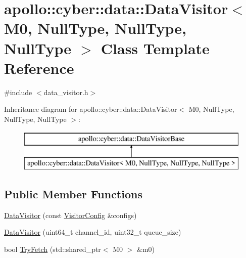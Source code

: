 \hypertarget{classapollo_1_1cyber_1_1data_1_1DataVisitor_3_01M0_00_01NullType_00_01NullType_00_01NullType_01_4}{\section{apollo\-:\-:cyber\-:\-:data\-:\-:Data\-Visitor$<$ M0, Null\-Type, Null\-Type, Null\-Type $>$ Class Template Reference}
\label{classapollo_1_1cyber_1_1data_1_1DataVisitor_3_01M0_00_01NullType_00_01NullType_00_01NullType_01_4}
}


{\ttfamily \#include $<$data\-\_\-visitor.\-h$>$}

Inheritance diagram for apollo\-:\-:cyber\-:\-:data\-:\-:Data\-Visitor$<$ M0, Null\-Type, Null\-Type, Null\-Type $>$\-:\begin{figure}[H]
\begin{center}
\leavevmode
\includegraphics[height=2.000000cm]{classapollo_1_1cyber_1_1data_1_1DataVisitor_3_01M0_00_01NullType_00_01NullType_00_01NullType_01_4}
\end{center}
\end{figure}
\subsection*{Public Member Functions}
\begin{DoxyCompactItemize}
\item 
\hyperlink{classapollo_1_1cyber_1_1data_1_1DataVisitor_3_01M0_00_01NullType_00_01NullType_00_01NullType_01_4_a79966a0db2a4d5f536cdb40013f2cbb5}{Data\-Visitor} (const \hyperlink{structapollo_1_1cyber_1_1data_1_1VisitorConfig}{Visitor\-Config} \&configs)
\item 
\hyperlink{classapollo_1_1cyber_1_1data_1_1DataVisitor_3_01M0_00_01NullType_00_01NullType_00_01NullType_01_4_a3177a3f23c49188f242deb65409c67e7}{Data\-Visitor} (uint64\-\_\-t channel\-\_\-id, uint32\-\_\-t queue\-\_\-size)
\item 
bool \hyperlink{classapollo_1_1cyber_1_1data_1_1DataVisitor_3_01M0_00_01NullType_00_01NullType_00_01NullType_01_4_a2030f650aeebdaaafcffdb3217bcd1d5}{Try\-Fetch} (std\-::shared\-\_\-ptr$<$ M0 $>$ \&m0)
\end{DoxyCompactItemize}
